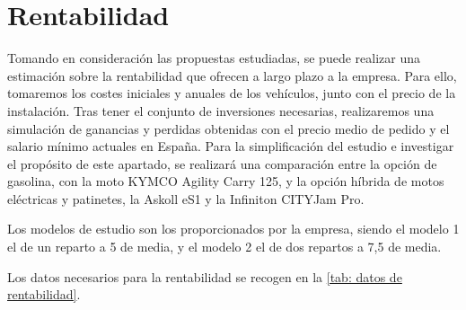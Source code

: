 \newpage
\section{Rentabilidad}
\label{Rentabilidad}

Tomando en consideración las propuestas estudiadas, se puede realizar una estimación sobre la rentabilidad que ofrecen a largo plazo a la empresa. Para ello, tomaremos los costes iniciales y anuales de los vehículos, junto con el precio de la instalación. Tras tener el conjunto de inversiones necesarias, realizaremos una simulación de ganancias y perdidas obtenidas con el precio medio de pedido y el salario mínimo actuales en España. Para la simplificación del estudio e investigar el propósito de este apartado, se realizará una comparación entre la opción de gasolina, con la moto KYMCO Agility Carry 125, y la opción híbrida de motos eléctricas y patinetes, la Askoll eS1 y la Infiniton CITYJam Pro.

Los modelos de estudio son los proporcionados por la empresa, siendo el modelo 1 el de un reparto a 5  de media, y el modelo 2 el de dos repartos a 7,5  de media.

Los datos necesarios para la rentabilidad se recogen en la \autoref{tab: datos de rentabilidad}.

